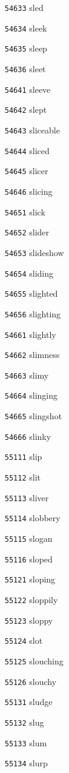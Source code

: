 \documentclass[twoside,11pt]{article}
\begin{document}
\begin{multicols}{5}
\begin{enumerate}
\item[\texttt{54633}] sled
\item[\texttt{54634}] sleek
\item[\texttt{54635}] sleep
\item[\texttt{54636}] sleet
\item[\texttt{54641}] sleeve
\item[\texttt{54642}] slept
\item[\texttt{54643}] sliceable
\item[\texttt{54644}] sliced
\item[\texttt{54645}] slicer
\item[\texttt{54646}] slicing
\item[\texttt{54651}] slick
\item[\texttt{54652}] slider
\item[\texttt{54653}] slideshow
\item[\texttt{54654}] sliding
\item[\texttt{54655}] slighted
\item[\texttt{54656}] slighting
\item[\texttt{54661}] slightly
\item[\texttt{54662}] slimness
\item[\texttt{54663}] slimy
\item[\texttt{54664}] slinging
\item[\texttt{54665}] slingshot
\item[\texttt{54666}] slinky
\item[\texttt{55111}] slip
\item[\texttt{55112}] slit
\item[\texttt{55113}] sliver
\item[\texttt{55114}] slobbery
\item[\texttt{55115}] slogan
\item[\texttt{55116}] sloped
\item[\texttt{55121}] sloping
\item[\texttt{55122}] sloppily
\item[\texttt{55123}] sloppy
\item[\texttt{55124}] slot
\item[\texttt{55125}] slouching
\item[\texttt{55126}] slouchy
\item[\texttt{55131}] sludge
\item[\texttt{55132}] slug
\item[\texttt{55133}] slum
\item[\texttt{55134}] slurp

\end{enumerate}
\end{multicols}
\end{document}
